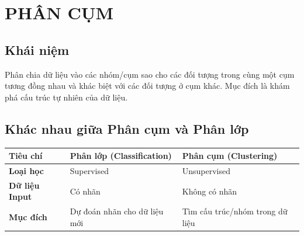 \section{PHÂN CỤM}

\subsection{Khái niệm}
Phân chia dữ liệu vào các nhóm/cụm sao cho các đối tượng trong cùng một cụm tương đồng nhau và khác biệt với các đối tượng ở cụm khác. Mục đích là khám phá cấu trúc tự nhiên của dữ liệu.

\subsection{Khác nhau giữa Phân cụm và Phân lớp}
\begin{table}[H]
    \centering
    \renewcommand{\arraystretch}{1.3}
    \begin{tabularx}{\textwidth}{|p{3cm}|X|X|}
        \hline
        \textbf{Tiêu chí} & \textbf{Phân lớp (Classification)} & \textbf{Phân cụm (Clustering)} \\
        \hline
        \textbf{Loại học} & Supervised & Unsupervised \\
        \hline
        \textbf{Dữ liệu Input} & Có nhãn & Không có nhãn \\
        \hline
        \textbf{Mục đích} & Dự đoán nhãn cho dữ liệu mới & Tìm cấu trúc/nhóm trong dữ liệu \\
        \hline
    \end{tabularx}
\end{table}